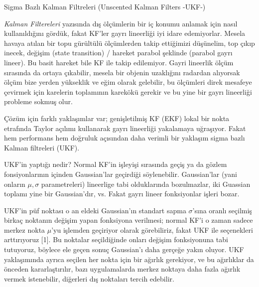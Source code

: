 \documentclass[12pt,fleqn]{article}\usepackage{../../common}
\begin{document}
Sigma Bazlı Kalman Filtreleri (Unscented Kalman Filters -UKF-)

{\em Kalman Filtereleri} yazısında dış ölçümlerin bir iç konumu anlamak
için nasıl kullanıldığını gördük, fakat KF'ler gayrı lineerliği iyi idare
edemiyorlar. Mesela havaya atılan bir topu gürültülü ölçümlerden takip
ettiğimizi düşünelim, top çıkıp inecek, değişim (state transition) /
hareket parabol şeklinde (parabol gayrı lineer). Bu basit hareket bile KF
ile takip edilemiyor. Gayri lineerlik ölçüm sırasında da ortaya çıkabilir,
mesela bir objenin uzaklığını radardan alıyorsak ölçüm bize yerden
yükseklik ve eğim olarak gelebilir, bu ölçümleri direk mesafeye çevirmek
için karelerin toplamının karekökü gerekir ve bu yine bir gayrı lineerliği
probleme sokmuş olur.

Çözüm için farklı yaklaşımlar var; genişletilmiş KF (EKF) lokal bir nokta
etrafında Taylor açılımı kullanarak gayrı lineerliği yakalamaya
uğraşıyor. Fakat hem performans hem doğruluk açısından daha verimli bir
yaklaşım sigma bazlı Kalman filtreleri (UKF).

UKF'in yaptığı nedir? Normal KF'in işleyişi sırasında geçiş ya da gözlem
fonsiyonlarının içinden Gaussian'lar geçirdiği söylenebilir.  Gaussian'lar
(yani onların $\mu,\sigma$ parametreleri) lineerlige tabi olduklarında
bozulmazlar, iki Guassian toplamı yine bir Gaussian'dır, vs. Fakat gayrı
lineer fonksiyonlar işleri bozar.

UKF'in püf noktası o an eldeki Gaussian'ın standart sapma $\sigma$'sına
oranlı seçilmiş birkaç noktanın değişim yapan fonksiyona verilmesi; normal
KF'i o zaman sadece merkez nokta $\mu$'yu işlemden geçiriyor olarak
görebiliriz, fakat UKF ile seçenekleri arttırıyoruz [1]. Bu noktalar
seçildiğinde onları değişim fonksiyonuna tabi tutuyoruz, böylece ele geçen
sonuç Gaussian'ı daha gerçeğe yakın oluyor. UKF yaklaşımında ayrıca seçilen
her nokta için bir ağırlık gerekiyor, ve bu ağırlıklar da önceden
kararlaştırılır, bazı uygulamalarda merkez noktaya daha fazla ağırlık
vermek istenebilir, diğerleri dış noktaları tercih edebilir.
\end{document}
